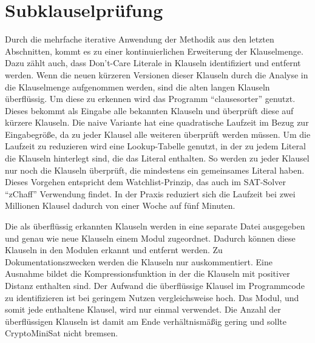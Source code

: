 \section{Subklauselprüfung}
\label{sec:ana:subclauses}

Durch die mehrfache iterative Anwendung der Methodik aus den letzten Abschnitten, kommt es zu einer kontinuierlichen Erweiterung der Klauselmenge.
Dazu zählt auch, dass Don't-Care Literale in Klauseln identifiziert und entfernt werden. Wenn die neuen kürzeren Versionen dieser Klauseln durch die
Analyse in die Klauselmenge aufgenommen werden, sind die alten langen Klauseln überflüssig. Um diese zu erkennen wird das Programm "`clausesorter"'
genutzt. Dieses bekommt als Eingabe alle bekannten Klauseln und überprüft diese auf kürzere Klauseln. Die naive Variante hat eine quadratische
Laufzeit im Bezug zur Eingabegröße, da zu jeder Klausel alle weiteren überprüft werden müssen. Um die Laufzeit zu reduzieren wird eine Lookup-Tabelle
genutzt, in der zu jedem Literal die Klauseln hinterlegt sind, die das Literal enthalten. So werden zu jeder Klausel nur noch die Klauseln überprüft,
die mindestens ein gemeinsames Literal haben. Dieses Vorgehen entspricht dem Watchlist-Prinzip, das auch im SAT-Solver "`zChaff"' \cite{zmmm} Verwendung
findet. In der Praxis reduziert sich die Laufzeit bei zwei Millionen Klausel dadurch von einer Woche auf fünf Minuten.

Die als überflüssig erkannten Klauseln werden in eine separate Datei ausgegeben und genau wie neue Klauseln einem Modul zugeordnet. Dadurch können
diese Klauseln in den Modulen erkannt und entfernt werden. Zu Dokumentationszwecken werden die Klauseln nur auskommentiert. Eine Ausnahme bildet
die Kompressionsfunktion in der die Klauseln mit positiver Distanz enthalten sind. Der Aufwand die überflüssige Klausel im Programmcode zu identifizieren
ist bei geringem Nutzen vergleichsweise hoch. Das Modul, und somit jede enthaltene Klausel, wird nur einmal verwendet. Die Anzahl der überflüssigen
Klauseln ist damit am Ende verhältnismäßig gering und sollte CryptoMiniSat nicht bremsen.
